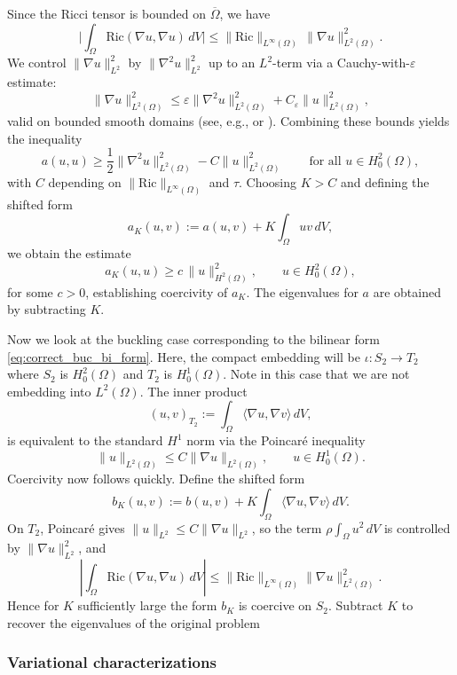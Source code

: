 \documentclass[11pt]{amsart}
\theoremstyle{definition}
\numberwithin{equation}{section}
\begin{document}
Since the Ricci tensor is bounded on $\overline{\Omega}$, we have
\[
\biggl|\int_{\Omega}\mathrm{Ric}(\nabla u,\nabla u)\,dV\biggr|
\le \|\mathrm{Ric}\|_{L^\infty(\Omega)}\,\|\nabla u\|_{L^2(\Omega)}^2.
\]
We control $\|\nabla u\|_{L^2}^2$ by $\|\nabla^2u\|_{L^2}^2$ up to an $L^2$-term via a Cauchy-with-$\varepsilon$ estimate:
\begin{equation}\label{eq:epsinterp}
\|\nabla u\|_{L^2(\Omega)}^2 \le \varepsilon \|\nabla^2 u\|_{L^2(\Omega)}^2 + C_\varepsilon \|u\|_{L^2(\Omega)}^2,
\end{equation}
valid on bounded smooth domains (see, e.g., \cite[Ch.~5]{E10} or \cite{L12}). Combining these bounds yields the inequality
\[
a(u,u)\ge \frac12\|\nabla^2u\|_{L^2(\Omega)}^2 - C\|u\|_{L^2(\Omega)}^2
\qquad\text{for all }u\in H^2_0(\Omega),
\]
with $C$ depending on $\|\mathrm{Ric}\|_{L^\infty(\Omega)}$ and $\tau$. Choosing $K>C$ and defining the shifted form
\[
a_K(u,v):=a(u,v)+K\int_{\Omega}uv\,dV,
\]
we obtain the estimate
\begin{equation}\label{eq:coerciveAK}
a_K(u,u) \ge c\,\|u\|_{H^2(\Omega)}^2, \qquad u\in H^2_0(\Omega),
\end{equation}
for some $c>0$, establishing coercivity of $a_K$. The eigenvalues for $a$ are obtained by subtracting $K$.

Now we look at the buckling case corresponding to the bilinear form \eqref{eq:correct_buc_bi_form}. Here, the compact embedding will be $\iota:S_2\to T_2$ where
$S_2$ is $H_0^2(\Omega)$ and $T_2$ is $H_0^1(\Omega)$. Note in this case that we are not embedding into $L^2(\Omega)$. The inner product
\[
(u,v)_{T_2}:=\int_\Omega \langle \nabla u,\nabla v\rangle\,dV,
\]
is equivalent to the standard $H^1$ norm via the Poincaré inequality
\[
\|u\|_{L^2(\Omega)} \leq C \|\nabla u\|_{L^2(\Omega)},
\qquad u\in H_0^1(\Omega).
\]
Coercivity now follows quickly. Define the shifted form
\[
b_K(u,v):=b(u,v)+K\int_\Omega \langle \nabla u,\nabla v\rangle\,dV.
\]
On $T_2$, Poincar\'e gives $\|u\|_{L^2}\le C\|\nabla u\|_{L^2}$, so the term
$\rho\int_\Omega u^2\,dV$ is controlled by $\|\nabla u\|_{L^2}^2$, and
\[
\left|\int_\Omega \mathrm{Ric}(\nabla u,\nabla u)\,dV\right|
\le \|\mathrm{Ric}\|_{L^\infty(\Omega)}\|\nabla u\|_{L^2(\Omega)}^2.
\]
Hence for $K$ sufficiently large the form $b_K$ is coercive on $S_2$. Subtract $K$ to recover the eigenvalues of the original problem
 
\subsubsection*{Variational characterizations}
\end{document}
